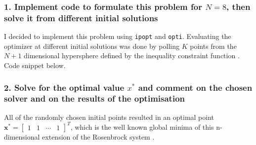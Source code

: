 \documentclass[letterpaper,12pt]{article}
\begin{document}
\subsubsection*{1. Implement code to formulate this problem for $N = 8$, then solve it from different initial solutions}
I decided to implement this problem using \texttt{ipopt} and \texttt{opti}. Evaluating the optimizer at different initial solutions was done by polling $K$ points from the $N + 1$ dimensional hypersphere defined by the inequality constraint function \cite{randsphere}. Code snippet below.




\subsubsection*{2. Solve for the optimal value $x^*$ and comment on the chosen solver and on the results of the optimisation}
All of the randomly chosen initial points resulted in an optimal point $\mathbf{x}^* = \begin{bmatrix}1& 1 & \cdots& 1\end{bmatrix}^T$, which is the well known global minima of this n-dimensional extension of the Rosenbrock system \cite{rosenbrockwiki}. 
\end{document}
